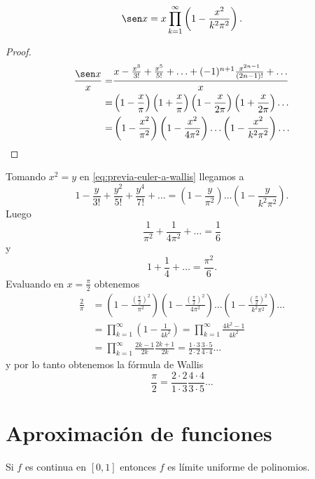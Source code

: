 \begin{teorema}[Euler(1748)]{}
\[\sen x=
x \prod\limits_{k=1}^{\infty}
\left(1-\frac{x^2}{k^2 \pi^2}\right).
\]
\end{teorema}

\begin{proof}
\begin{equation}\label{eq:previa-euler-a-wallis}
\begin{split}
\frac{\sen x}{x}=&\frac{x-\frac{x^3}{3!}+\frac{x^5}{5!}+\ldots+(-1)^{n+1}\frac{x^{2n-1}}{(2n-1)!}+\ldots}{x}
\\
=&\left(1-\frac{x}{\pi}\right)\left(1+\frac{x}{\pi}\right)\left(1-\frac{x}{2\pi}\right)\left(1+\frac{x}{2\pi}\right)\ldots
\\
=& \left(1-\frac{x^2}{\pi^2}\right) \left(1-\frac{x^2}{4\pi^2}\right)\ldots \left(1-\frac{x^2}{k^2 \pi^2}\right)\ldots
\end{split}
\end{equation}
\end{proof}
Tomando $x^2=y$  en \eqref{eq:previa-euler-a-wallis} llegamos a 
\[1-\frac{y}{3!}+\frac{y^2}{5!}+\frac{y^4}{7!}+\ldots=\left(1-\frac{y}{\pi^2}\right)\ldots\left(1-\frac{y}{k^2\pi^2}\right).
\]
Luego
\[
\frac{1}{\pi^2}+\frac{1}{4\pi^2}+\ldots=\frac{1}{6}
\]
y 
\[
1+\frac{1}{4}+\ldots=\frac{\pi^2}{6}.
\]
Evaluando en $x=\frac{\pi}{2}$ obtenemos
\[
\begin{split}
\frac{2}{\pi}&=
\left(1-\frac{(\frac{\pi}{2})^2}{\pi^2}\right) \left(1-\frac{(\frac{\pi}{2})^2}{4\pi^2}\right)\ldots
\left(1-\frac{(\frac{\pi}{2})^2}{k^2\pi^2}\right)\ldots
\\
&=\prod\limits_{k=1}^{\infty} \left(1-\frac{1}{4k^2}\right)=\prod\limits_{k=1}^{\infty}\frac{4k^2-1}{4k^2}
\\
&=\prod\limits_{k=1}^{\infty} \frac{2k-1}{2k}\frac{2k+1}{2k}=\frac{1\cdot3}{2\cdot 2}\frac{3 \cdot 5}{4 \cdot 4}\ldots
\end{split}
\]
y por lo tanto obtenemos la fórmula de Wallis
\[
\frac{\pi}{2}=\frac{2\cdot 2}{1 \cdot 3}\frac{4 \cdot 4}{3\cdot 5}\ldots
\]

\section{Aproximación de funciones}

\begin{teorema}[Weierstrass]{}
Si $f$ es continua en $[0,1]$ entonces $f$ es límite uniforme de polinomios.
\end{teorema}

